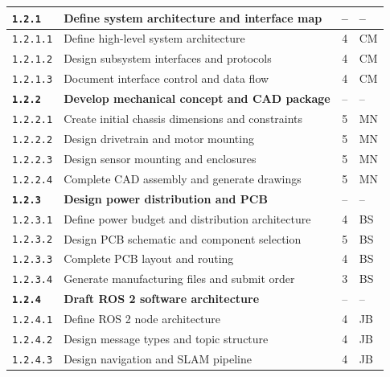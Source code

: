 \begin{longtable}{|l|p{6.5cm}|c|l|}
\rowcolor{designyellow!35}
\texttt{\textbf{1.2.1}} & \textbf{Define system architecture and interface map} & -- & -- \\
\hline
\rowcolor{white}
\texttt{1.2.1.1} & \quad Define high-level system architecture & 4 & CM \\
\hline
\rowcolor{designyellow!15}
\texttt{1.2.1.2} & \quad Design subsystem interfaces and protocols & 4 & CM \\
\hline
\rowcolor{white}
\texttt{1.2.1.3} & \quad Document interface control and data flow & 4 & CM \\
\hline
\rowcolor{designyellow!35}
\texttt{\textbf{1.2.2}} & \textbf{Develop mechanical concept and CAD package} & -- & -- \\
\hline
\rowcolor{designyellow!15}
\texttt{1.2.2.1} & \quad Create initial chassis dimensions and constraints & 5 & MN \\
\hline
\rowcolor{white}
\texttt{1.2.2.2} & \quad Design drivetrain and motor mounting & 5 & MN \\
\hline
\rowcolor{designyellow!15}
\texttt{1.2.2.3} & \quad Design sensor mounting and enclosures & 5 & MN \\
\hline
\rowcolor{white}
\texttt{1.2.2.4} & \quad Complete CAD assembly and generate drawings & 5 & MN \\
\hline
\rowcolor{designyellow!35}
\texttt{\textbf{1.2.3}} & \textbf{Design power distribution and PCB} & -- & -- \\
\hline
\rowcolor{designyellow!15}
\texttt{1.2.3.1} & \quad Define power budget and distribution architecture & 4 & BS \\
\hline
\rowcolor{white}
\texttt{1.2.3.2} & \quad Design PCB schematic and component selection & 5 & BS \\
\hline
\rowcolor{designyellow!15}
\texttt{1.2.3.3} & \quad Complete PCB layout and routing & 4 & BS \\
\hline
\rowcolor{white}
\texttt{1.2.3.4} & \quad Generate manufacturing files and submit order & 3 & BS \\
\hline
\rowcolor{designyellow!35}
\texttt{\textbf{1.2.4}} & \textbf{Draft ROS 2 software architecture} & -- & -- \\
\hline
\rowcolor{designyellow!15}
\texttt{1.2.4.1} & \quad Define ROS 2 node architecture & 4 & JB \\
\hline
\rowcolor{white}
\texttt{1.2.4.2} & \quad Design message types and topic structure & 4 & JB \\
\hline
\rowcolor{designyellow!15}
\texttt{1.2.4.3} & \quad Design navigation and SLAM pipeline & 4 & JB \\

\end{longtable}
